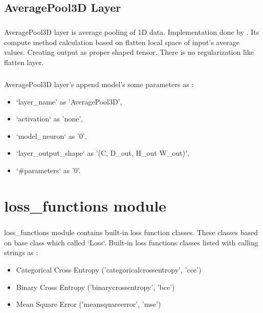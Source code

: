\documentclass[12pt]{report}
\begin{document}
\section{AveragePool3D Layer}

\paragraph{}
AveragePool3D layer is average pooling of 1D data. Implementation done by \cite{MGK}. Its compute method calculation based on flatten local space of input's average values. Creating output as proper shaped tensor. There is no regularization like flatten layer.

\paragraph{}
AveragePool3D layer's append model's some parameters as :
\begin{itemize}
	\item `layer\_name' as 'AveragePool3D',
	\item `activation` as 'none',
	\item `model\_neuron` as '0',
	\item `layer\_output\_shape` as '(C, D\_out, H\_out W\_out)',
	\item `\#parameters` as '0'.
\end{itemize}





\chapter{loss\_functions module}
\label{ch:loss}

\paragraph{}
loss\_functions module contains built-in loss function classes. These classes based on base class which called `Loss`. Built-in loss functions classes listed with calling strings as : 

\begin{itemize}
	\item Categorical Cross Entropy ('categoricalcrossentropy', 'cce')
	\item Binary Cross Entropy ('binarycrossentropy', 'bce')
	\item Mean Square Error  ('meansquareerror', 'mse')
\end{itemize}
\end{document}
